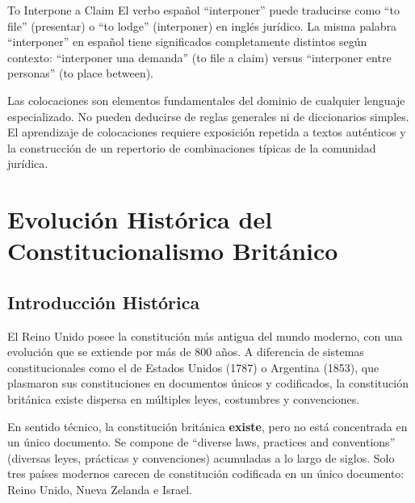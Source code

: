\documentclass[12pt,oneside]{book}
\begin{document}
\begin{example}{To Interpone a Claim}
El verbo español ``interponer'' puede traducirse como ``to file'' (presentar) o ``to lodge'' (interponer) en inglés jurídico. La misma palabra ``interponer'' en español tiene significados completamente distintos según contexto: ``interponer una demanda'' (to file a claim) versus ``interponer entre personas'' (to place between).
\end{example}

\begin{important}
Las colocaciones son elementos fundamentales del dominio de cualquier lenguaje especializado. No pueden deducirse de reglas generales ni de diccionarios simples. El aprendizaje de colocaciones requiere exposición repetida a textos auténticos y la construcción de un repertorio de combinaciones típicas de la comunidad jurídica.
\end{important}


\chapter{Evolución Histórica del Constitucionalismo Británico}

\section{Introducción Histórica}

El Reino Unido posee la constitución más antigua del mundo moderno, con una evolución que se extiende por más de 800 años. A diferencia de sistemas constitucionales como el de Estados Unidos (1787) o Argentina (1853), que plasmaron sus constituciones en documentos únicos y codificados, la constitución británica existe dispersa en múltiples leyes, costumbres y convenciones.

\begin{important}
En sentido técnico, la constitución británica \textbf{existe}, pero no está concentrada en un único documento. Se compone de ``diverse laws, practices and conventions'' (diversas leyes, prácticas y convenciones) acumuladas a lo largo de siglos. Solo tres países modernos carecen de constitución codificada en un único documento: Reino Unido, Nueva Zelanda e Israel.
\end{important}
\end{document}
